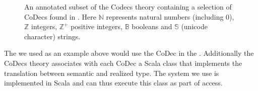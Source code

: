 \begin{figure}[ht]\centering
  \caption[List of Codecs]{
    An annotated subset of the Codecs theory containing a selection of CoDecs found in \mmt. 
    Here $\mathbb{N}$ represents natural numbers (including $0$), 
    $\mathbb{Z}$ integers, 
    $\mathbb{Z}^{+}$ positive integers, 
    $\mathbb{B}$ booleans and
    $\mathbb{S}$ (unicode character) strings. 
  }
  \label{fig:codecs}
\end{figure}
The  we used as an example above would use the  CoDec in the \lmfdb. 
Additionally the \textsf{CoDecs} theory associates with each CoDec a Scala class that implements the translation between semantic and realized type. 
The \mmt system we use is implemented in Scala and can thus execute this class as part of \lmfdb access. 

